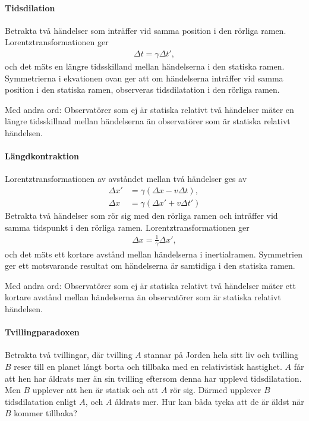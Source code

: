 \paragraph{Tidsdilation}
Betrakta två händelser som inträffer vid samma position i den rörliga ramen. Lorentztransformationen ger
\begin{align*}
	\Delta t = \gamma\Delta t',
\end{align*}
och det mäts en längre tidsskilland mellan händelserna i den statiska ramen. Symmetrierna i ekvationen ovan ger att om händelserna inträffer vid samma position i den statiska ramen, observeras tidsdilatation i den rörliga ramen.

Med andra ord: Observatörer som ej är statiska relativt två händelser mäter en längre tidsskillnad mellan händelserna än observatörer som är statiska relativt händelsen.

\paragraph{Längdkontraktion}
Lorentztransformationen av avståndet mellan två händelser ges av
\begin{align*}
	\Delta x' &= \gamma(\Delta x - v\Delta t), \\
	\Delta x  &= \gamma(\Delta x' + v\Delta t')
\end{align*}
Betrakta två händelser som rör sig med den rörliga ramen och inträffer vid samma tidspunkt i den rörliga ramen. Lorentztransformationen ger
\begin{align*}
	\Delta x = \frac{1}{\gamma}\Delta x',
\end{align*}
och det mäts ett kortare avstånd mellan händelserna i inertialramen. Symmetrien ger ett motsvarande resultat om händelserna är samtidiga i den statiska ramen.

Med andra ord: Observatörer som ej är statiska relativt två händelser mäter ett kortare avstånd mellan händelserna än observatörer som är statiska relativt händelsen.

\paragraph{Tvillingparadoxen}
Betrakta två tvillingar, där tvilling $A$ stannar på Jorden hela sitt liv och tvilling $B$ reser till en planet långt borta och tillbaka med en relativistisk hastighet. $A$ får att hen har åldrats mer än sin tvilling eftersom denna har upplevd tidsdilatation. Men $B$ upplever att hen är statisk och att $A$ rör sig. Därmed upplever $B$ tidsdilatation enligt $A$, och $A$ åldrats mer. Hur kan båda tycka att de är äldst när $B$ kommer tillbaka?

